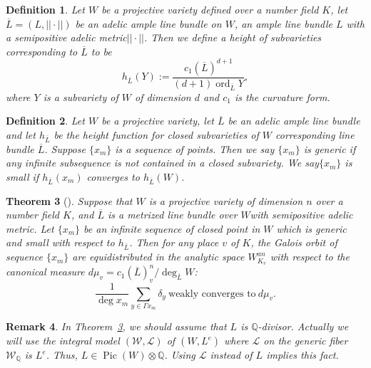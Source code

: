 \documentclass[11pt,letterpaper]{amsart}
\newtheorem{thm}{Theorem}[section]
\newtheorem{df}[thm]{Definition}
\newtheorem{rem}[thm]{Remark}
\begin{document}
    \begin{df}
        Let $W$ be a projective variety defined over a number field $K$, let $\overline{L} = (L,||\cdot||)$ be an adelic ample line bundle  on $W$, an ample line bundle $L$ with a semipositive adelic metric$||\cdot||$. Then we define \emph{a height of subvarieties corresponding to $\overline{L}$} to be
        \[
        {h}_{\overline{L}} (Y) := \dfrac{c_1({\overline{L}})^{d+1}}{(d+1){\operatorname{ord}}_{\overline{L}} Y},
        \]
        where $Y$ is a subvariety of $W$ of dimension $d$ and $c_1$ is the curvature form.
    \end{df}

    \begin{df}
        Let $W$ be a projective variety, let $\overline{L}$ be an adelic ample line bundle and let ${h}_{\overline{L}}$ be the height function for closed subvarieties of $W$ corresponding line bundle $\overline{L}$. Suppose $\{x_m\}$ is a sequence of points. Then we say
        \emph{$\{x_m\}$ is generic} if any infinite subsequence is not contained in a closed subvariety. We say\emph{$\{x_m\}$ is small}
        if ${h}_{\overline{L}}(x_m)$ converges to ${h}_{\overline{L}}(W)$.
    \end{df}

    \begin{thm}[{\cite[Theorem 3.2]{Y}}]\label{yuan}
        Suppose that $W$ is a projective variety of dimension $n$ over a number field $K$, and $\overline{L}$ is a metrized line bundle over $W$with semipositive adelic metric. Let $\{x_m\}$ be an infinite sequence of closed point in $W$ which is generic and small with respect to $h_{\overline{L}}$. Then for any place $v$ of $K$, the Galois orbit of sequence $\{x_m\}$ are equidistributed in the analytic space $W^{an}_{K_{v}}$ with respect to the canonical measure $d\mu_{v} = c_1(\overline{L})^n_v / \deg_{\overline{L}} W$:
        \[
        \dfrac{1}{\deg x_m} \sum_{y \in \Gamma x_m} \delta_y ~\text{weakly converges to}~ d\mu_{v}.
        \]
    \end{thm}

    \begin{rem}
        In Theorem~\ref{yuan}, we should assume that $L$ is $\mathbb{Q}$-divisor. Actually we will use the integral model $(\mathcal{W}, \mathcal{L})$ of $(W,L^e)$ where  $\mathcal{L}$ on the generic fiber $\mathcal{W}_{\mathbb{Q}}$ is $L^e$. Thus, $L \in {\operatorname{Pic}}(W)\otimes \mathbb{Q}$. Using $\mathcal{L}$ instead of $L$ implies this fact.
    \end{rem}
\end{document}
